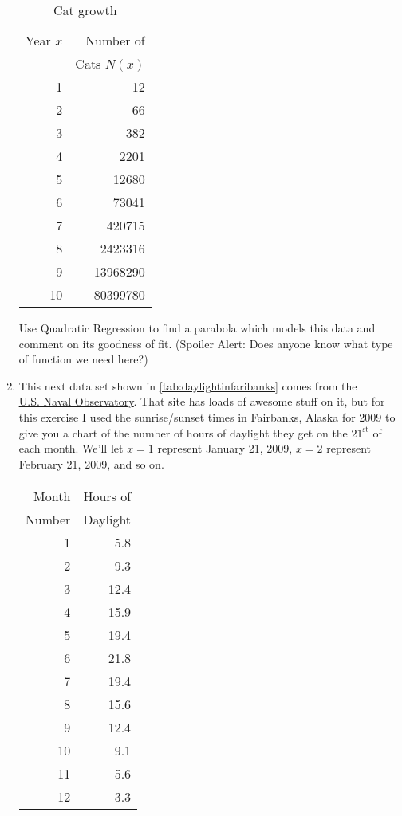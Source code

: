 \begin{exenum}
\begin{enumerate}
\begin{table}
\begin{center}
\begin{tabular}{|r|r|} \hline
Year $x$ & Number of \\
& Cats $N(x)$ \\
\hline
1 & 12 \\
\hline 
2 & 66  \\
\hline 
3 & 382 \\
\hline 
4 & 2201 \\
\hline 
5 & 12680\\
\hline 
6 & 73041\\
\hline 
7 & 420715\\
\hline 
8 & 2423316\\
\hline 
9 & 13968290\\
\hline 
10 & 80399780\\ 
\hline 
\end{tabular}

\caption{Cat growth}
\label{tab:catgrowth}
\end{center}
\end{table}

Use Quadratic Regression to find a parabola which models this data and comment on its goodness of fit. (Spoiler Alert: Does anyone know what type of function we need here?)

\item \label{regsunlight} This next data set shown in \autoref{tab:daylightinfaribanks} comes from the \\ \href{http://aa.usno.navy.mil/data/docs/RS_OneYear.php}{\underline{U.S. Naval Observatory}}.  That site has loads of awesome stuff on it, but for this exercise I used the sunrise/sunset times in Fairbanks, Alaska for 2009 to give you a chart of the number of hours of daylight they get on the $21^{\mbox{st}}$ of each month.  We'll let $x = 1$ represent January 21, 2009, $x = 2$ represent February 21, 2009, and so on.

\begin{table}
\begin{center}
    
\begin{tabular}{|r|r|} \hline
Month  & Hours of\\
Number & Daylight \\
1 & 5.8 \\
\hline 
2 &9.3\\
\hline 
3 &12.4\\
\hline 
4 & 15.9\\
\hline 
5 & 19.4\\
\hline 
6 & 21.8\\
\hline 
7 & 19.4\\
\hline 
8 & 15.6\\
\hline 
9 & 12.4\\
\hline 
10 & 9.1\\
\hline 
11 & 5.6\\
\hline 
12 & 3.3\\ 
\hline 
\end{tabular}


\end{center}
\end{table}
\end{enumerate}
\end{exenum}
